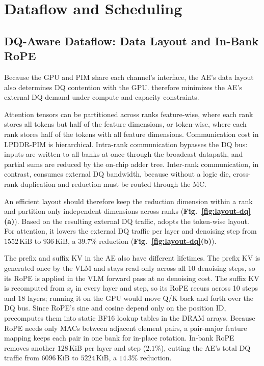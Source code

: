 \section{Dataflow and Scheduling}
\label{sec:dataflow}
\subsection{DQ-Aware Dataflow: Data Layout and In-Bank RoPE}
\label{sec:dataflow-a}
Because the GPU and PIM share each channel's interface, the AE's data layout also determines DQ contention with the GPU. \sys{} therefore minimizes the AE's external DQ demand under compute and capacity constraints.

Attention tensors can be partitioned across ranks feature-wise, where each rank stores all tokens but half of the feature dimensions, or token-wise, where each rank stores half of the tokens with all feature dimensions. Communication cost in LPDDR-PIM is hierarchical. Intra-rank communication bypasses the DQ bus: inputs are written to all banks at once through the broadcast datapath, and partial sums are reduced by the on-chip adder tree. Inter-rank communication, in contrast, consumes external DQ bandwidth, because without a logic die, cross-rank duplication and reduction must be routed through the MC.

An efficient layout should therefore keep the reduction dimension within a rank and partition only independent dimensions across ranks (\textbf{Fig.~\ref{fig:layout-dq}(a)}). Based on the resulting external DQ traffic, \sys{} adopts the token-wise layout. For attention, it lowers the external DQ traffic per layer and denoising step from $1552\,\mathrm{KiB}$ to $936\,\mathrm{KiB}$, a $39.7\%$ reduction (\textbf{Fig.~\ref{fig:layout-dq}(b)}).

The prefix and suffix KV in the AE also have different lifetimes. The prefix KV is generated once by the VLM and stays read-only across all 10 denoising steps, so its RoPE is applied in the VLM forward pass at no denoising cost. The suffix KV is recomputed from $x_t$ in every layer and step, so its RoPE recurs across 10 steps and 18 layers; running it on the GPU would move Q/K back and forth over the DQ bus. Since RoPE's sine and cosine depend only on the position ID, \sys{} precomputes them into static BF16 lookup tables in the DRAM arrays. Because RoPE needs only MACs between adjacent element pairs, a pair-major feature mapping keeps each pair in one bank for in-place rotation. In-bank RoPE removes another $128\,\mathrm{KiB}$ per layer and step ($2.1\%$), cutting the AE's total DQ traffic from $6096\,\mathrm{KiB}$ to $5224\,\mathrm{KiB}$, a $14.3\%$ reduction.

